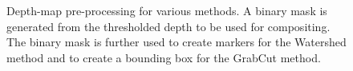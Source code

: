 \begin{figure}[t]
\centering
{}
\newline
\centering
{}
\caption[Depth-map pre-processing for various methods.]{Depth-map pre-processing for various methods. A binary mask is generated from the thresholded depth to be used for compositing. The binary mask is further used to create markers for the Watershed method and to create a bounding box for the GrabCut method.}
\label{fig:depth-pre-f}
\end{figure}

